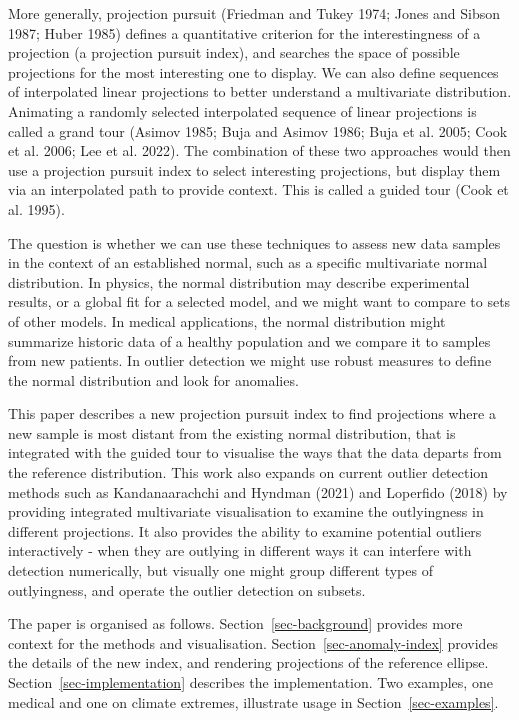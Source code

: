 \documentclass[
  12pt,
]{interact}
\begin{document}
More generally, projection pursuit (Friedman and Tukey 1974; Jones and
Sibson 1987; Huber 1985) defines a quantitative criterion for the
interestingness of a projection (a projection pursuit index), and
searches the space of possible projections for the most interesting one
to display. We can also define sequences of interpolated linear
projections to better understand a multivariate distribution. Animating
a randomly selected interpolated sequence of linear projections is
called a grand tour (Asimov 1985; Buja and Asimov 1986; Buja et al.
2005; Cook et al. 2006; Lee et al. 2022). The combination of these two
approaches would then use a projection pursuit index to select
interesting projections, but display them via an interpolated path to
provide context. This is called a guided tour (Cook et al. 1995).

The question is whether we can use these techniques to assess new data
samples in the context of an established normal, such as a specific
multivariate normal distribution. In physics, the normal distribution
may describe experimental results, or a global fit for a selected model,
and we might want to compare to sets of other models. In medical
applications, the normal distribution might summarize historic data of a
healthy population and we compare it to samples from new patients. In
outlier detection we might use robust measures to define the normal
distribution and look for anomalies.

This paper describes a new projection pursuit index to find projections
where a new sample is most distant from the existing normal
distribution, that is integrated with the guided tour to visualise the
ways that the data departs from the reference distribution. This work
also expands on current outlier detection methods such as
Kandanaarachchi and Hyndman (2021) and Loperfido (2018) by providing
integrated multivariate visualisation to examine the outlyingness in
different projections. It also provides the ability to examine potential
outliers interactively - when they are outlying in different ways it can
interfere with detection numerically, but visually one might group
different types of outlyingness, and operate the outlier detection on
subsets.

The paper is organised as follows. Section~\ref{sec-background} provides
more context for the methods and visualisation.
Section~\ref{sec-anomaly-index} provides the details of the new index,
and rendering projections of the reference ellipse.
Section~\ref{sec-implementation} describes the implementation. Two
examples, one medical and one on climate extremes, illustrate usage in
Section~\ref{sec-examples}.
\end{document}
